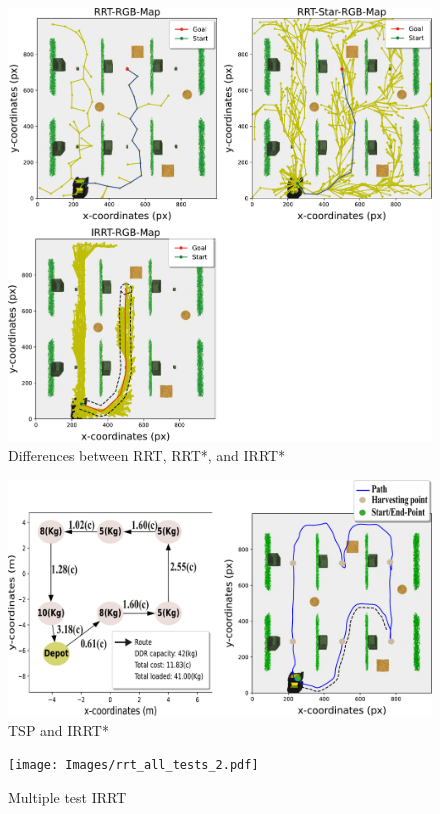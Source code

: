 \documentclass[conference]{IEEEtran}
\begin{document}
\begin{figure}[t!]
        \centering
        \includegraphics[width=\linewidth]{Images/test_rrt_5.pdf}
        \caption{Differences between RRT, RRT*, and IRRT*}
        \label{fig:test_rrt}
\end{figure}

\begin{figure}[t!]
        \centering
        \includegraphics[width=\linewidth]{Images/tsp_rrt_1.pdf}
        \caption{TSP and IRRT*}
        \label{fig:test_rrt}
\end{figure}

\begin{figure}[t!]
    \centering
    \texttt{[image: Images/rrt\_all\_tests\_2.pdf]}
    \caption{Multiple test IRRT }
    \label{fig:rgb1}
\end{figure}
\end{document}
